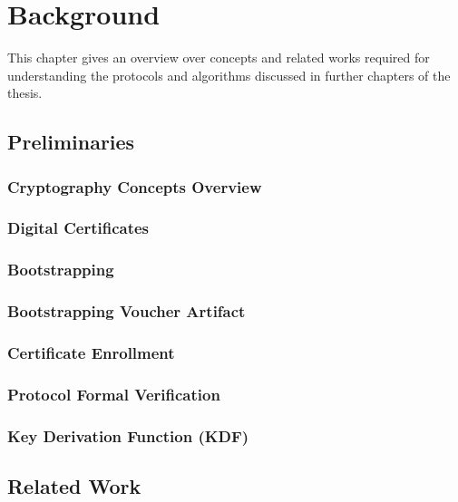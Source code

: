 \chapter{Background}
\label{ch:background}
This chapter gives an overview over concepts and related works required for understanding the protocols and algorithms discussed in further chapters of the thesis.
\section{Preliminaries}

\subsection{Cryptography Concepts Overview}


\subsection{Digital Certificates}


\subsection{Bootstrapping}


\subsection{Bootstrapping Voucher Artifact}


\subsection{Certificate Enrollment}


\subsection{Protocol Formal Verification}\label{bg:pfm}


\subsection{Key Derivation Function (KDF)} \label{backgroung:kdf}


\section{Related Work}


